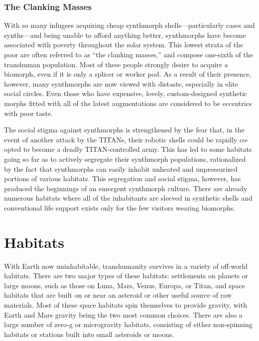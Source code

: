 \subsubsection{The Clanking Masses}

With so many infugees acquiring cheap synthmorph 
shells—particularly cases and synths—and being 
unable to afford anything better, synthmorphs have 
become associated with poverty throughout the solar 
system. This lowest strata of the poor are often referred 
to as ``the clanking masses,'' and compose one-sixth 
of the transhuman population. Most of these people 
strongly desire to acquire a biomorph, even if it is only 
a splicer or worker pod. As a result of their presence, 
however, many synthmorphs are now viewed with 
distaste, especially in elite social circles. Even those 
who have expensive, lovely, custom-designed synthetic 
morphs fitted with all of the latest augmentations are 
considered to be eccentrics with poor taste.

The social stigma against synthmorphs is strengthened by the fear that, in the event of another attack 
by the TITANs, their robotic shells could be rapidly 
co-opted to become a deadly TITAN-controlled army. 
This has led to some habitats going so far as to actively segregate their synthmorph populations, rationalized by the fact that synthmorphs can easily inhabit 
unheated and unpressurized portions of various habitats. This segregation and social stigma, however, has 
produced the beginnings of an emergent synthmorph 
culture. There are already numerous habitats where 
all of the inhabitants are sleeved in synthetic shells 
and conventional life support exists only for the few 
visitors wearing biomorphs.

\section{Habitats}

With Earth now uninhabitable, transhumanity survives in a variety of off-world habitats. There are two 
major types of these habitats: settlements on planets 
or large moons, such as those on Luna, Mars, Venus, 
Europa, or Titan, and space habitats that are built on 
or near an asteroid or other useful source of raw materials. Most of these space habitats spin themselves 
to provide gravity, with Earth and Mars gravity being 
the two most common choices. There are also a large 
number of zero-g or microgravity habitats, consisting 
of either non-spinning habitats or stations built into 
small asteroids or moons.

